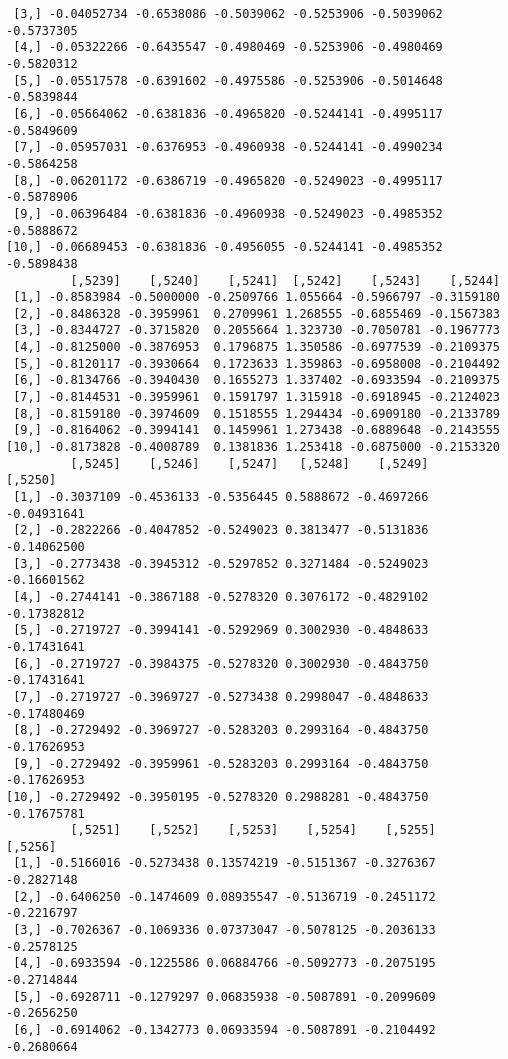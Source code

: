 \documentclass[
  letterpaper,
  DIV=11,
  numbers=noendperiod]{scrreprt}
\begin{document}
\begin{verbatim}
 [3,] -0.04052734 -0.6538086 -0.5039062 -0.5253906 -0.5039062 -0.5737305
 [4,] -0.05322266 -0.6435547 -0.4980469 -0.5253906 -0.4980469 -0.5820312
 [5,] -0.05517578 -0.6391602 -0.4975586 -0.5253906 -0.5014648 -0.5839844
 [6,] -0.05664062 -0.6381836 -0.4965820 -0.5244141 -0.4995117 -0.5849609
 [7,] -0.05957031 -0.6376953 -0.4960938 -0.5244141 -0.4990234 -0.5864258
 [8,] -0.06201172 -0.6386719 -0.4965820 -0.5249023 -0.4995117 -0.5878906
 [9,] -0.06396484 -0.6381836 -0.4960938 -0.5249023 -0.4985352 -0.5888672
[10,] -0.06689453 -0.6381836 -0.4956055 -0.5244141 -0.4985352 -0.5898438
         [,5239]    [,5240]    [,5241]  [,5242]    [,5243]    [,5244]
 [1,] -0.8583984 -0.5000000 -0.2509766 1.055664 -0.5966797 -0.3159180
 [2,] -0.8486328 -0.3959961  0.2709961 1.268555 -0.6855469 -0.1567383
 [3,] -0.8344727 -0.3715820  0.2055664 1.323730 -0.7050781 -0.1967773
 [4,] -0.8125000 -0.3876953  0.1796875 1.350586 -0.6977539 -0.2109375
 [5,] -0.8120117 -0.3930664  0.1723633 1.359863 -0.6958008 -0.2104492
 [6,] -0.8134766 -0.3940430  0.1655273 1.337402 -0.6933594 -0.2109375
 [7,] -0.8144531 -0.3959961  0.1591797 1.315918 -0.6918945 -0.2124023
 [8,] -0.8159180 -0.3974609  0.1518555 1.294434 -0.6909180 -0.2133789
 [9,] -0.8164062 -0.3994141  0.1459961 1.273438 -0.6889648 -0.2143555
[10,] -0.8173828 -0.4008789  0.1381836 1.253418 -0.6875000 -0.2153320
         [,5245]    [,5246]    [,5247]   [,5248]    [,5249]     [,5250]
 [1,] -0.3037109 -0.4536133 -0.5356445 0.5888672 -0.4697266 -0.04931641
 [2,] -0.2822266 -0.4047852 -0.5249023 0.3813477 -0.5131836 -0.14062500
 [3,] -0.2773438 -0.3945312 -0.5297852 0.3271484 -0.5249023 -0.16601562
 [4,] -0.2744141 -0.3867188 -0.5278320 0.3076172 -0.4829102 -0.17382812
 [5,] -0.2719727 -0.3994141 -0.5292969 0.3002930 -0.4848633 -0.17431641
 [6,] -0.2719727 -0.3984375 -0.5278320 0.3002930 -0.4843750 -0.17431641
 [7,] -0.2719727 -0.3969727 -0.5273438 0.2998047 -0.4848633 -0.17480469
 [8,] -0.2729492 -0.3969727 -0.5283203 0.2993164 -0.4843750 -0.17626953
 [9,] -0.2729492 -0.3959961 -0.5283203 0.2993164 -0.4843750 -0.17626953
[10,] -0.2729492 -0.3950195 -0.5278320 0.2988281 -0.4843750 -0.17675781
         [,5251]    [,5252]    [,5253]    [,5254]    [,5255]    [,5256]
 [1,] -0.5166016 -0.5273438 0.13574219 -0.5151367 -0.3276367 -0.2827148
 [2,] -0.6406250 -0.1474609 0.08935547 -0.5136719 -0.2451172 -0.2216797
 [3,] -0.7026367 -0.1069336 0.07373047 -0.5078125 -0.2036133 -0.2578125
 [4,] -0.6933594 -0.1225586 0.06884766 -0.5092773 -0.2075195 -0.2714844
 [5,] -0.6928711 -0.1279297 0.06835938 -0.5087891 -0.2099609 -0.2656250
 [6,] -0.6914062 -0.1342773 0.06933594 -0.5087891 -0.2104492 -0.2680664

\end{verbatim}
\end{document}
